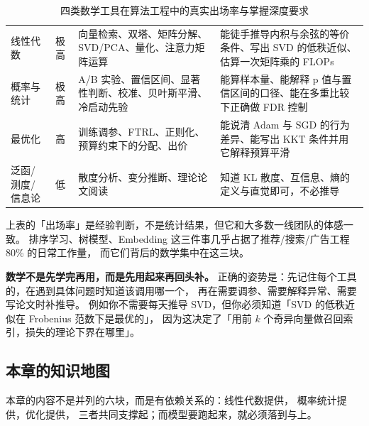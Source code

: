 \begin{table}[htbp]
\centering
\caption{四类数学工具在算法工程中的真实出场率与掌握深度要求}
\label{tab:math-tools}
\small
\begin{tabularx}{\textwidth}{L{2.5cm} L{1.6cm} L{4.6cm} Y}
\toprule
{} &  &  &  \\
\midrule
线性代数 & 极高 & 向量检索、双塔、矩阵分解、SVD/PCA、量化、注意力矩阵运算 &
能徒手推导内积与余弦的等价条件、写出 SVD 的低秩近似、估算一次矩阵乘的 FLOPs \\
\addlinespace
概率与统计 & 极高 & A/B 实验、置信区间、显著性判断、校准、贝叶斯平滑、冷启动先验 &
能算样本量、能解释 p 值与置信区间的口径、能在多重比较下正确做 FDR 控制 \\
\addlinespace
最优化 & 高 & 训练调参、FTRL、正则化、预算约束下的分配、出价 &
能说清 Adam 与 SGD 的行为差异、能写出 KKT 条件并用它解释预算平滑 \\
\addlinespace
泛函/测度/信息论 & 低 & 散度分析、变分推断、理论论文阅读 &
知道 KL 散度、互信息、熵的定义与直觉即可，不必推导 \\
\bottomrule
\end{tabularx}
\end{table}

上表的「出场率」是经验判断，不是统计结果，但它和大多数一线团队的体感一致。
排序学习、树模型、Embedding 这三件事几乎占据了推荐/搜索/广告工程 80\% 的日常工作量，
而它们背后的数学集中在这三块。

\begin{keypoint}
\textbf{数学不是先学完再用，而是先用起来再回头补。}
正确的姿势是：先记住每个工具的，在遇到具体问题时知道该调用哪一个，
再在需要调参、需要解释异常、需要写论文时补推导。
例如你不需要每天推导 SVD，但你必须知道「SVD 的低秩近似在 Frobenius 范数下是最优的」，
因为这决定了「用前 $k$ 个奇异向量做召回索引，损失的理论下界在哪里」。
\end{keypoint}

\subsection{本章的知识地图}

本章的内容不是并列的六块，而是有依赖关系的：线性代数提供，
概率统计提供，优化提供，
三者共同支撑起；而模型要跑起来，就必须落到与上。


